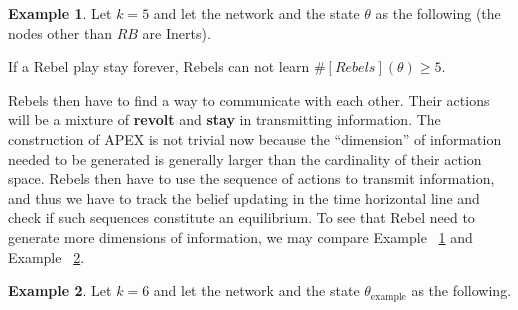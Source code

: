 \documentclass[12pt,letter]{article}
\theoremstyle{definition}
\newtheorem{example}{Example}[section]
\theoremstyle{remark}
\theoremstyle{claim}
\begin{document}
\begin{example}\label{ex_circle_number_5}
Let $k=5$ and let the network and the state $\theta$ as the following (the nodes other than $RB$ are Inerts).

\begin{center} 
\end{center} 

If a Rebel play stay forever, Rebels can not learn $\#[Rebels](\theta)\geq 5$. 
\end{example}

Rebels then have to find a way to communicate with each other. Their actions will be a mixture of \textbf{revolt} and \textbf{stay} in transmitting information. The construction of APEX is not trivial now because the ``dimension'' of information needed to be generated is generally larger than the cardinality of their action space. Rebels then have to use the sequence of actions to transmit information, and thus we have to track the belief updating in the time horizontal line and check if such sequences constitute an equilibrium. To see that Rebel need to generate more dimensions of information, we may compare Example ~\ref{ex_circle_number_5} and Example ~\ref{ex_circle_number_6}.
\begin{example}\label{ex_circle_number_6}
Let $k=6$ and let the network and the state $\theta_{\text{example}}$ as the following.
\begin{center} 
\end{center} 


\end{example}
\end{document}
